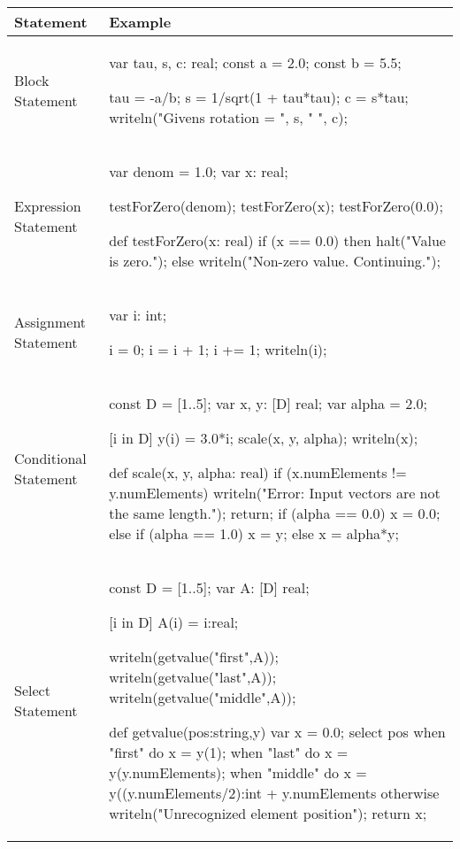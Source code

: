 \begin{center}
\begin{tabular}{|l|l|}
\hline
{\bf Statement} & {\bf Example} \\
\hline
Block Statement &
\begin{chapel} %
var tau, s, c: real;
const a = 2.0;
const b = 5.5;

{
tau = -a/b;
s = 1/sqrt(1 + tau*tau);
c = s*tau;
}
writeln("Givens rotation = ", s, " ", c);
\end{chapel} \\
\hline
Expression Statement & 
\begin{chapel} %
var denom = 1.0;
var x: real;

testForZero(denom);
testForZero(x);
testForZero(0.0);

def testForZero(x: real) {
  if (x == 0.0) then halt("Value is zero.");
  else writeln("Non-zero value.  Continuing.");   
}
\end{chapel} \\
\hline
Assignment Statement & 
\begin{chapel} %
var i: int;

i = 0;
i = i + 1;
i += 1;
writeln(i);
\end{chapel} \\
\hline
Conditional Statement &
\begin{chapel} %
const D = [1..5];
var x, y: [D] real;
var alpha = 2.0;

[i in D] y(i) = 3.0*i;
scale(x, y, alpha);
writeln(x);

def scale(x, y, alpha: real) {
  if (x.numElements != y.numElements) {
    writeln("Error:  Input vectors are not the same length.");
    return;
  }
  if (alpha == 0.0) {
    x = 0.0;
  } else if (alpha == 1.0) {
    x = y;
  } else {
    x = alpha*y;
  }
}
\end{chapel} \\
\hline
Select Statement &
\begin{chapel} %
const D = [1..5];
var A: [D] real;

[i in D] A(i) = i:real;

writeln(getvalue("first",A));
writeln(getvalue("last",A));
writeln(getvalue("middle",A));

def getvalue(pos:string,y) {
  var x = 0.0;
  select pos {
    when "first" do x = y(1);
    when "last" do x = y(y.numElements);
    when "middle" do x = y((y.numElements/2):int + y.numElements%
    otherwise writeln("Unrecognized element position");
  }
  return x;
}
\end{chapel} \\
\hline
\end{tabular}


\end{center}
